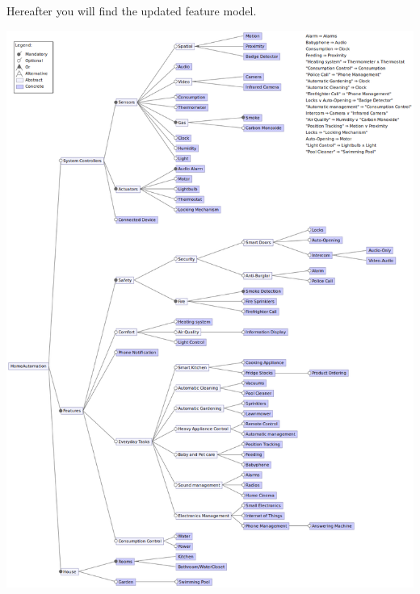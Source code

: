 \begin{appendices}
		Hereafter you will find the updated feature model.
	    \begin{changemargin}{-2cm}{-3cm}
    	  \includegraphics[width=\textwidth]{featuremodel_revisited}
	    \end{changemargin}
  \end{appendices}


